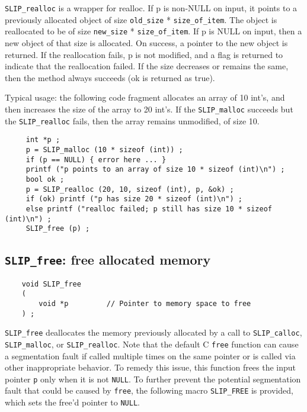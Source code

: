\documentclass[12pt]{article}
\theoremstyle{definition}
\begin{document}
\verb|SLIP_realloc| is a wrapper for realloc.  If p is non-NULL on input, it
points to a previously allocated object of size \verb|old_size| *
\verb|size_of_item|.  The object is reallocated to be of size \verb|new_size| *
\verb|size_of_item|.  If p is NULL on input, then a new object of that size is
allocated.  On success, a pointer to the new object is returned.  If the
reallocation fails, p is not modified, and a flag is returned to indicate that
the reallocation failed.  If the size decreases or remains the same, then the
method always succeeds (ok is returned as true).

Typical usage:  the following code fragment allocates an array of 10 int's,
and then increases the size of the array to 20 int's.  If the \verb|SLIP_malloc|
succeeds but the \verb|SLIP_realloc| fails, then the array remains unmodified,
of size 10.

\begin{mdframed}[userdefinedwidth=6in]
{\footnotesize
\begin{verbatim}
     int *p ;
     p = SLIP_malloc (10 * sizeof (int)) ;
     if (p == NULL) { error here ... }
     printf ("p points to an array of size 10 * sizeof (int)\n") ;
     bool ok ;
     p = SLIP_realloc (20, 10, sizeof (int), p, &ok) ;
     if (ok) printf ("p has size 20 * sizeof (int)\n") ;
     else printf ("realloc failed; p still has size 10 * sizeof (int)\n") ;
     SLIP_free (p) ;
\end{verbatim}
} \end{mdframed}

\cprotect\subsection{\verb|SLIP_free|: free allocated memory}
\label{ss:SLIP_free}

\begin{mdframed}[userdefinedwidth=6in]
{\footnotesize
\begin{verbatim}
    void SLIP_free
    (
        void *p         // Pointer to memory space to free
    ) ;
\end{verbatim}
} \end{mdframed}

\verb|SLIP_free| deallocates the memory previously allocated by a call to
\verb|SLIP_calloc|, \verb|SLIP_malloc|, or \verb|SLIP_realloc|. Note that the
default C \verb|free| function can cause a segmentation fault if called
multiple times on the same pointer or is called via other inappropriate
behavior. To remedy this issue, this function frees the input pointer \verb|p|
only when it is not \verb|NULL|. To further prevent the potential segmentation
fault that could be caused by \verb|free|, the following macro \verb|SLIP_FREE|
is provided, which sets the free'd pointer to \verb|NULL|.
\end{document}
